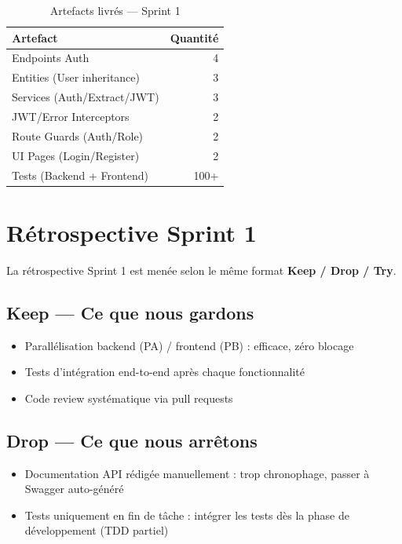 \documentclass[12pt,a4paper]{report}
\begin{document}
\begin{table}[H]
\centering
\caption{Artefacts livrés — Sprint 1}
\begin{tabular}{|l|r|}
\hline
\textbf{Artefact} & \textbf{Quantité} \\
\hline
Endpoints Auth & 4 \\
Entities (User inheritance) & 3 \\
Services (Auth/Extract/JWT) & 3 \\
JWT/Error Interceptors & 2 \\
Route Guards (Auth/Role) & 2 \\
UI Pages (Login/Register) & 2 \\
Tests (Backend + Frontend) & 100+ \\
\hline
\end{tabular}
\end{table}

\section{Rétrospective Sprint 1}

La rétrospective Sprint 1 est menée selon le même format \textbf{Keep / Drop / Try}.

\subsection{Keep — Ce que nous gardons}

\begin{itemize}[itemsep=0.3em]
    \item Parallélisation backend (PA) / frontend (PB) : efficace, zéro blocage
    \item Tests d'intégration end-to-end après chaque fonctionnalité
    \item Code review systématique via pull requests
\end{itemize}

\subsection{Drop — Ce que nous arrêtons}

\begin{itemize}[itemsep=0.3em]
    \item Documentation API rédigée manuellement : trop chronophage, passer à Swagger auto-généré
    \item Tests uniquement en fin de tâche : intégrer les tests dès la phase de développement (TDD partiel)
\end{itemize}
\end{document}
